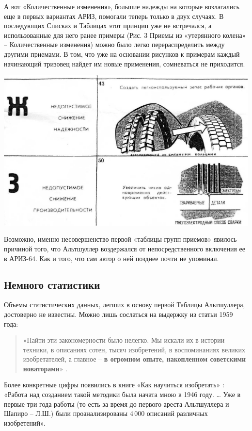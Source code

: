 \documentclass[11pt,a4paper]{article}
\begin{document}
А вот «Количественные изменения», большие надежды на которые возлагались еще в
первых вариантах АРИЗ, помогали теперь только в двух случаях. В последующих
Списках и Таблицах этот принцип уже не встречался, а использованные для него
ранее примеры (Рис. 3 Приемы из «утерянного колена» -- Количественные изменения)
можно было легко перераспределить между другими приемами. В том, что уже на
основании рисунков к примерам каждый начинающий тризовец найдет им новые
применения, сомневаться не приходится.
\begin{center}
  \includegraphics[width=.8\textwidth]{./18.jpg}
\end{center}

Возможно, именно несовершенство первой «таблицы групп приемов» явилось
причиной того, что Альтшуллер воздержался от непосредственного включения ее в
АРИЗ-64.  Как и того, что сам автор о ней позднее почти не упоминал.

\subsection*{Немного статистики}

Объемы статистических данных, легших в основу первой Таблицы Альтшуллера,
достоверно не известны. Можно лишь сослаться на выдержку из статьи 1959 года:
\begin{quote}  
  «Найти эти закономерности было нелегко. Мы искали их в истории техники, в
  описаниях сотен, тысяч изобретений, в воспоминаниях великих изобретателей, а
  главное -- \textbf{в огромном опыте, накопленном советскими новаторами}»
  \cite{Altshuller1959}.
\end{quote}
Более конкретные цифры появились в книге «Как научиться изобретать»
\cite{Altshuller1961}: «Работа над созданием такой методики была начата мною в
1946 году. …  Уже в первые три года работы (то есть за время до первого ареста
Альтшуллера и Шапиро -- Л.Ш.) были проанализированы 4\,000 описаний различных
изобретений».
\end{document}
